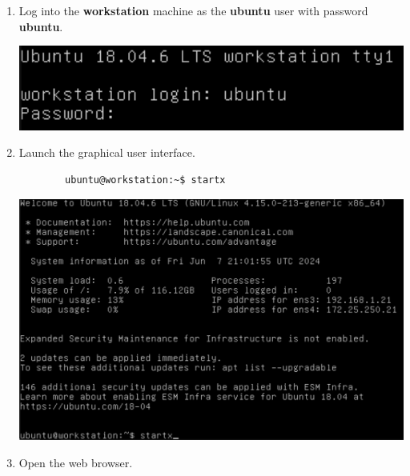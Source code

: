 \documentclass[letterpaper, 12pt]{article}
\begin{document}
\begin{enumerate}
    \item Log into the \textbf{workstation} machine as the \textbf{ubuntu} user with password \textbf{ubuntu}.

    \begin{center}
        \includegraphics[width=\linewidth]{images/part1/step1.png}
    \end{center}

    \item Launch the graphical user interface.
    \begin{lstlisting}
        ubuntu@workstation:~$ startx
    \end{lstlisting}

    \begin{center}
        \includegraphics[width=\linewidth]{images/part1/step2.png}
    \end{center}

    \item Open the web browser.


\end{enumerate}
\end{document}
